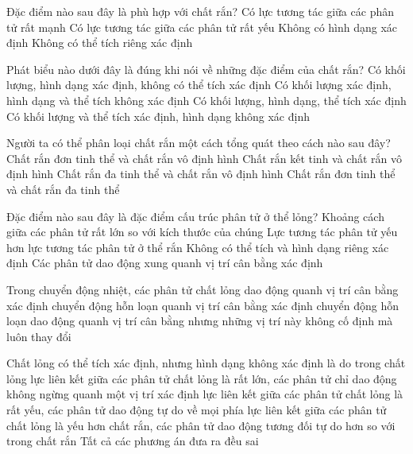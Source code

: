 \begin{ex}
Đặc điểm nào sau đây là phù hợp với chất rắn?
\choice
{\True Có lực tương tác giữa các phân tử rất mạnh}
{ Có lực tương tác giữa các phân tử rất yếu}
{ Không có hình dạng xác định}
{ Không có thể tích riêng xác định}
\end{ex}


\begin{ex}
Phát biểu nào dưới đây là đúng khi nói về những đặc điểm của chất rắn?
\choice
{ Có khối lượng, hình dạng xác định, không có thể tích xác định}
{ Có khối lượng xác định, hình dạng và thể tích không xác định}
{\True Có khối lượng, hình dạng, thể tích xác định}
{ Có khối lượng và thể tích xác định, hình dạng không xác định}
\end{ex}


\begin{ex}
Người ta có thể phân loại chất rắn một cách tổng quát theo cách nào sau đây?
\choice
{ Chất rắn đơn tinh thể và chất rắn vô định hình}
{\True Chất rắn kết tinh và chất rắn vô định hình}
{ Chất rắn đa tinh thể và chất rắn vô định hình}
{ Chất rắn đơn tinh thể và chất rắn đa tinh thể}
\end{ex}


\begin{ex} 
Đặc điểm nào sau đây là đặc điểm cấu trúc phân tử ở thể lỏng?
\choice
{ Khoảng cách giữa các phân tử rất lớn so với kích thước của chúng}
{\True Lực tương tác phân tử yếu hơn lực tương tác phân tử ở thể rắn}
{ Không có thể tích và hình dạng riêng xác định}
{ Các phân tử dao động xung quanh vị trí cân bằng xác định}
\end{ex}


\begin{ex} 
Trong chuyển động nhiệt, các phân tử chất lỏng
\choice
{ dao động quanh vị trí cân bằng xác định}
{ chuyển động hỗn loạn quanh vị trí cân bằng xác định}
{ chuyển động hỗn loạn}
{\True dao động quanh vị trí cân bằng nhưng những vị trí này không cố định mà luôn thay đổi}
\end{ex}


\begin{ex}
Chất lỏng có thể tích xác định, nhưng hình dạng không xác định là do trong chất lỏng
\choice
{ lực liên kết giữa các phân tử chất lỏng là rất lớn, các phân tử chỉ dao động không ngừng quanh một vị trí xác định}
{ lực liên kết giữa các phân tử chất lỏng là rất yếu, các phân tử dao động tự do về mọi phía}
{\True lực liên kết giữa các phân tử chất lỏng là yếu hơn chất rắn, các phân tử dao động tương đối tự do hơn so với trong chất rắn}
{ Tất cả các phương án đưa ra đều sai}
\end{ex}


